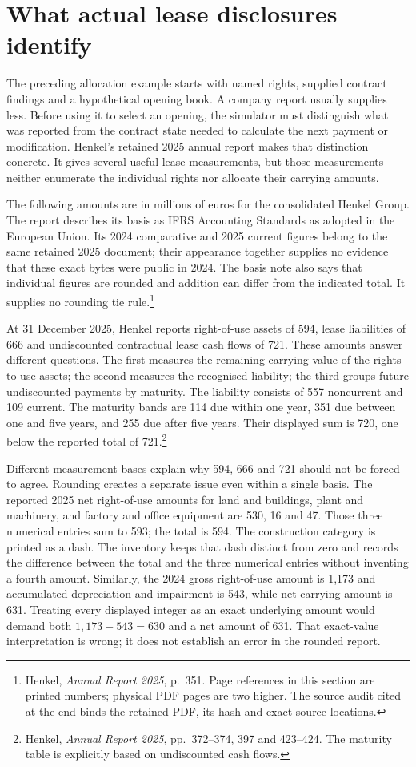 \section{What actual lease disclosures identify}
\label{sec:henkel-lease-measurements}

The preceding allocation example starts with named rights, supplied contract
findings and a hypothetical opening book. A company report usually supplies
less. Before using it to select an opening, the simulator must distinguish what
was reported from the contract state needed to calculate the next payment or
modification. Henkel's retained 2025 annual report makes that distinction
concrete. It gives several useful lease measurements, but those measurements
neither enumerate the individual rights nor allocate their carrying amounts.

The following amounts are in millions of euros for the consolidated Henkel
Group. The report describes its basis as IFRS Accounting Standards as adopted
in the European Union. Its 2024 comparative and 2025 current figures belong to
the same retained 2025 document; their appearance together supplies no evidence
that these exact bytes were public in 2024. The basis note also says that
individual figures are rounded and addition can differ from the indicated
total. It supplies no rounding tie rule.\footnote{Henkel, \emph{Annual Report
2025}, p.~351. Page references in this section are printed numbers; physical
PDF pages are two higher. The source audit cited at the end binds the retained
PDF, its hash and exact source locations.}

At 31 December 2025, Henkel reports right-of-use assets of 594, lease
liabilities of 666 and undiscounted contractual lease cash flows of 721.
These amounts answer different questions. The first measures the remaining
carrying value of the rights to use assets; the second measures the recognised
liability; the third groups future undiscounted payments by maturity. The
liability consists of 557 noncurrent and 109 current. The maturity bands are
114 due within one year, 351 due between one and five years, and 255 due after
five years. Their displayed sum is 720, one below the reported total of
721.\footnote{Henkel, \emph{Annual Report 2025}, pp.~372--374, 397 and 423--424.
The maturity table is explicitly based on undiscounted cash flows.}

Different measurement bases explain why 594, 666 and 721 should not be forced
to agree. Rounding creates a separate issue even within a single basis.
The reported 2025 net right-of-use amounts for land and buildings, plant and
machinery, and factory and office equipment are 530, 16 and 47. Those three
numerical entries sum to 593; the total is 594. The construction category is
printed as a dash. The inventory keeps that dash distinct from zero and records
the difference between the total and the three numerical entries without
inventing a fourth amount. Similarly, the 2024 gross right-of-use amount is
1,173 and accumulated depreciation and impairment is 543, while net carrying
amount is 631. Treating every displayed integer as an exact underlying amount
would demand both $1{,}173-543=630$ and a net amount of 631. That exact-value
interpretation is wrong; it does not establish an error in the rounded report.

